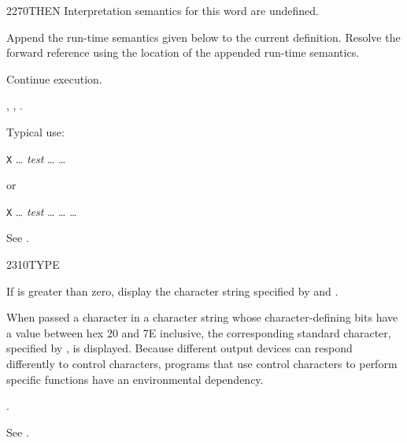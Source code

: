 \begin{worddef}{2270}{THEN}
\interpret
	Interpretation semantics for this word are undefined.

\compile

	Append the run-time semantics given below to the current
	definition. Resolve the forward reference  using
	the location of the appended run-time semantics.

\runtime
	\stack{}{}

	Continue execution.

\see {},
	,
	.

	\begin{rationale} %
		Typical use:

		\tab \word{:} \texttt{X} {\ldots}
			\emph{test}  {\ldots} 
			{\ldots} \word{;}

		or

		\tab \word{:} \texttt{X} {\ldots}
			\emph{test}  {\ldots}  {\ldots} 
			{\ldots} \word{;}
	\end{rationale}

	\begin{testing} %
		See .
	\end{testing}
\end{worddef}


\begin{worddef}{2310}{TYPE}
\item {}

	If  is greater than zero, display the character string
	specified by  and .

	When passed a character in a character string whose
	character-defining bits have a value between hex 20 and 7E
	inclusive, the corresponding standard character, specified
	by , is displayed.
	Because different output devices can respond differently to
	control characters, programs that use control characters to
	perform specific functions have an environmental dependency.

\see {}.

	\begin{testing} %
		See .
	\end{testing}
\end{worddef}


